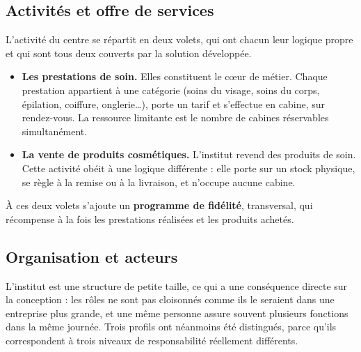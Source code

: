 \subsection{Activités et offre de services}

L'activité du centre se répartit en deux volets, qui ont chacun leur logique
propre et qui sont tous deux couverts par la solution développée.

\begin{itemize}[leftmargin=1.2cm]
  \item \textbf{Les prestations de soin.} Elles constituent le c\oe ur de
  métier. Chaque prestation appartient à une catégorie (soins du visage, soins
  du corps, épilation, coiffure, onglerie\ldots), porte un tarif et
  s'effectue en cabine, sur rendez-vous. La ressource limitante est le nombre
  de cabines réservables simultanément.

  \item \textbf{La vente de produits cosmétiques.} L'institut revend des
  produits de soin. Cette activité obéit à une logique différente : elle porte
  sur un stock physique, se règle à la remise ou à la livraison, et n'occupe
  aucune cabine.
\end{itemize}

À ces deux volets s'ajoute un \textbf{programme de fidélité}, transversal, qui
récompense à la fois les prestations réalisées et les produits achetés.

\subsection{Organisation et acteurs}

L'institut est une structure de petite taille, ce qui a une conséquence directe
sur la conception : les rôles ne sont pas cloisonnés comme ils le seraient dans
une entreprise plus grande, et une même personne assure souvent plusieurs
fonctions dans la même journée. Trois profils ont néanmoins été distingués,
parce qu'ils correspondent à trois niveaux de responsabilité réellement
différents.

